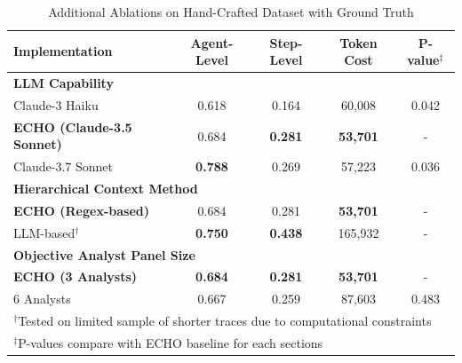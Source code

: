 \documentclass{article}
\begin{document}
\begin{table}[t]
\caption{Additional Ablations on Hand-Crafted Dataset with Ground Truth}
\label{tab:ablation-additional}
\centering
\small
\begin{tabular}{lcccc}
\toprule
Implementation & Agent-Level & Step-Level & Token Cost & P-value$^{\ddagger}$ \\
\midrule
\multicolumn{5}{l}{\textbf{LLM Capability}} \\
Claude-3 Haiku & 0.618 & 0.164 & 60,008 & 0.042 \\
\textbf{ECHO (Claude-3.5 Sonnet)} & 0.684 & \textbf{0.281} & \textbf{53,701} & - \\
Claude-3.7 Sonnet & \textbf{0.788} & 0.269 & 57,223 & 0.036 \\
\midrule
\multicolumn{5}{l}{\textbf{Hierarchical Context Method}} \\
\textbf{ECHO (Regex-based)} & 0.684 & 0.281 & \textbf{53,701} & - \\
LLM-based$^{\dagger}$ & \textbf{0.750} & \textbf{0.438} & 165,932 & - \\
\midrule
\multicolumn{5}{l}{\textbf{Objective Analyst Panel Size}} \\
\textbf{ECHO (3 Analysts)} & \textbf{0.684} & \textbf{0.281} & \textbf{53,701} & - \\
6 Analysts & 0.667 & 0.259 & 87,603 & 0.483 \\
\bottomrule
\multicolumn{5}{l}{\small $^{\dagger}$Tested on limited sample of shorter traces due to computational constraints} \\
\multicolumn{5}{l}{\small $^{\ddagger}$P-values compare with ECHO baseline for each sections} \\
\end{tabular}
\end{table}


\end{document}
